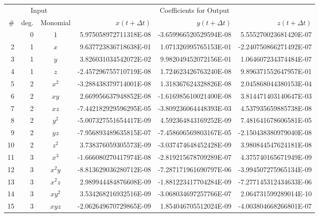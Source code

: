 \documentclass{article}
\begin{document}
\begin{table}[ht!]
\begin{center}
\fontsize{8.0pt}{10pt}\selectfont
{}\selectfont
\renewcommand{\arraystretch}{1.05}
\setlength{\tabcolsep}{0.5em}
\begin{tabular}{rrcrrr}
\toprule
\multicolumn{3}{c}{Input} & \multicolumn{3}{c}{Coefficients for Output} \\ 
\cmidrule(lr){1-3} \cmidrule(lr){4-6}
\# & deg. & Monomial & $x(t + \Delta\!t)$ & $y(t + \Delta\!t)$ & $z(t + \Delta\!t)$ \\ 
\midrule\addlinespace[2.5pt]
1 & 0 & $1$ & 5.975058972711318E-08 & -3.659966520529594E-08 & 5.555270023681420E-07 \\ 
2 & 1 & $x$ & 9.637723836718638E-01 & 1.071326995765153E-01 & -2.240750866271492E-07 \\ 
3 & 1 & $y$ & 3.826031034542072E-02 & 9.982049452072156E-01 & 1.064607234374484E-07 \\ 
4 & 1 & $z$ & -2.457296755710719E-08 & 1.724623426763240E-08 & 9.896371552647957E-01 \\ 
5 & 2 & $x^{2}$ & -3.288438379714001E-08 & 1.318367624328826E-08 & 2.045868044380153E-04 \\ 
6 & 2 & $xy$ & 2.669956637948852E-08 & -1.616985610021400E-08 & 3.814471403140647E-03 \\ 
7 & 2 & $xz$ & -7.442182929596295E-05 & -3.809236064448393E-03 & 4.537935659885738E-08 \\ 
8 & 2 & $y^{2}$ & -5.007327551654417E-09 & 4.592364843169252E-09 & 7.481641678606581E-05 \\ 
9 & 2 & $yz$ & -7.956893489635815E-07 & -7.458606569803167E-05 & -2.150438380979040E-08 \\ 
10 & 2 & $z^{2}$ & 3.738376059305573E-09 & -3.037474648452428E-09 & 3.980844547624181E-08 \\ 
11 & 3 & $x^{3}$ & -1.666080270417974E-08 & -2.819215678709289E-07 & 4.375740165671949E-09 \\ 
12 & 3 & $x^{2}y$ & -8.813629036280712E-08 & -7.287171961690797E-06 & -3.994507275965134E-09 \\ 
13 & 3 & $x^{2}z$ & 2.989944484876608E-09 & -1.881223417704284E-09 & -7.277145312434633E-06 \\ 
14 & 3 & $xy^{2}$ & 3.534268216932516E-09 & -3.068034697257766E-07 & 2.064731599289014E-10 \\ 
15 & 3 & $xyz$ & -2.062649670729865E-09 & 1.854046705512024E-09 & -4.003804668266801E-07 \\ 

\end{tabular}
\end{center}
\end{table}
\end{document}
